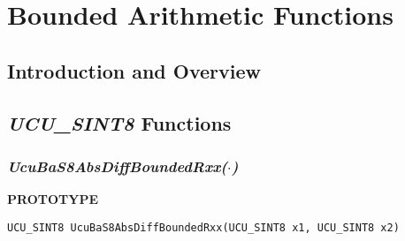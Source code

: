 
\chapter{Bounded Arithmetic Functions}

\label{cbaf0}

\section{Introduction and Overview}
\label{cbaf0:siov0}


\section{\emph{UCU\_SINT8} Functions}
\label{cbaf0:sscf0}


\subsection[\emph{UcuBaS8AbsDiffBoundedRxx(\protect\mbox{\protect$\cdot$})}]
           {\emph{UcuBaS8AbsDiffBoundedRxx(\protect\mbox{\protect\boldmath $\cdot$})}}
\label{cbaf0:sscf0:sfss1}

%

\noindent\textbf{PROTOTYPE}
\begin {list}{}{\setlength{\leftmargin}{0.25in}\setlength{\topsep}{0.0in}}
\item
\begin{verbatim}
UCU_SINT8 UcuBaS8AbsDiffBoundedRxx(UCU_SINT8 x1, UCU_SINT8 x2)
\end{verbatim}
\end{list}
\vspace{2.8ex}

